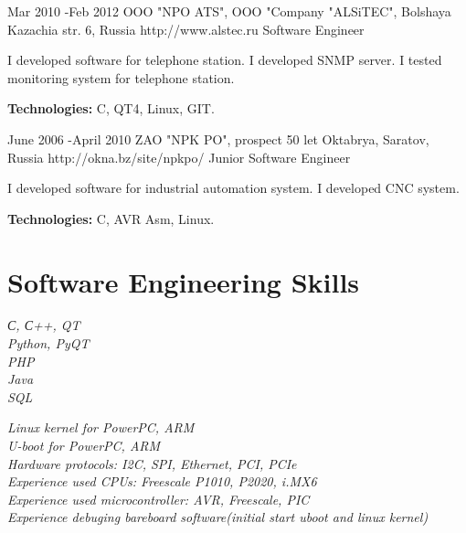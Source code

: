 
\job
{Mar 2010 -}{Feb 2012}
{OOO "NPO ATS", OOO "Company "ALSiTEC", Bolshaya Kazachia str. 6, Russia}
{http://www.alstec.ru}
{Software Engineer}
{I developed software for telephone station. I developed SNMP server. I tested monitoring system for telephone station.\\
\rule{0mm}{5mm}\textbf{Technologies:} C, QT4, Linux, GIT.}


\job
{June 2006 -}{April 2010}
{ZAO "NPK PO", prospect 50 let Oktabrya, Saratov, Russia}
{http://okna.bz/site/npkpo/}
{Junior Software Engineer}
{I developed software for industrial automation system. I developed CNC system.\\
\rule{0mm}{5mm}\textbf{Technologies:} C, AVR Asm, Linux.}




\section{Software Engineering Skills}

{
\textit{С, С++, QT}\\
\textit{Python, PyQT}\\
\textit{PHP}\\
\textit{Java}\\
\textit{SQL}
}


{
\textit{Linux kernel for PowerPC, ARM}\\
\textit{U-boot for PowerPC, ARM}\\
\textit{Hardware protocols: I2C, SPI, Ethernet, PCI, PCIe}\\
\textit{Experience used CPUs: Freescale P1010, P2020, i.MX6}\\
\textit{Experience used microcontroller: AVR, Freescale, PIC}\\
\textit{Experience debuging bareboard software(initial start uboot and linux kernel)}
}


